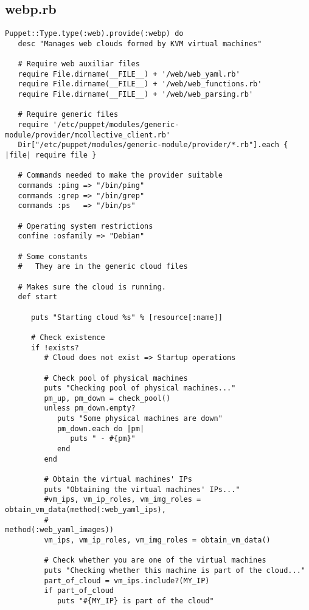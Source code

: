 \subsection{webp.rb}


\begin{lstlisting}
Puppet::Type.type(:web).provide(:webp) do
   desc "Manages web clouds formed by KVM virtual machines"

   # Require web auxiliar files
   require File.dirname(__FILE__) + '/web/web_yaml.rb'
   require File.dirname(__FILE__) + '/web/web_functions.rb'
   require File.dirname(__FILE__) + '/web/web_parsing.rb'
   
   # Require generic files
   require '/etc/puppet/modules/generic-module/provider/mcollective_client.rb'
   Dir["/etc/puppet/modules/generic-module/provider/*.rb"].each { |file| require file }
   
   # Commands needed to make the provider suitable
   commands :ping => "/bin/ping"
   commands :grep => "/bin/grep"
   commands :ps   => "/bin/ps"
   
   # Operating system restrictions
   confine :osfamily => "Debian"

   # Some constants
   #   They are in the generic cloud files

   # Makes sure the cloud is running.
   def start

      puts "Starting cloud %s" % [resource[:name]]
      
      # Check existence
      if !exists?
         # Cloud does not exist => Startup operations
         
         # Check pool of physical machines
         puts "Checking pool of physical machines..."
         pm_up, pm_down = check_pool()
         unless pm_down.empty?
            puts "Some physical machines are down"
            pm_down.each do |pm|
               puts " - #{pm}"
            end
         end
         
         # Obtain the virtual machines' IPs
         puts "Obtaining the virtual machines' IPs..."
         #vm_ips, vm_ip_roles, vm_img_roles = obtain_vm_data(method(:web_yaml_ips),
         #                                                   method(:web_yaml_images))
         vm_ips, vm_ip_roles, vm_img_roles = obtain_vm_data()
         
         # Check whether you are one of the virtual machines
         puts "Checking whether this machine is part of the cloud..."
         part_of_cloud = vm_ips.include?(MY_IP)
         if part_of_cloud
            puts "#{MY_IP} is part of the cloud"
            

\end{lstlisting}
